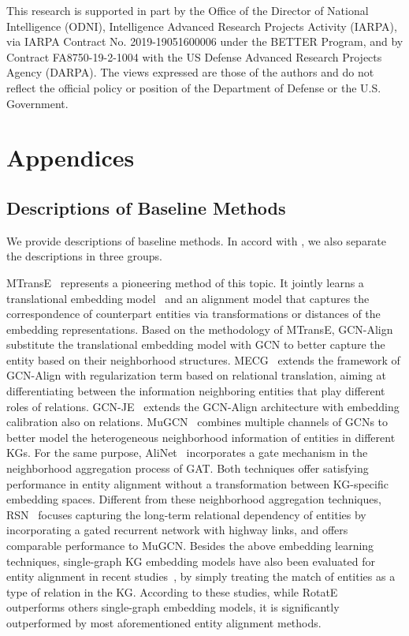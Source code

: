 \documentclass[11pt,a4paper]{article}
\begin{document}
This research is supported in part by the Office of the Director of National Intelligence (ODNI), Intelligence Advanced Research Projects Activity (IARPA), via IARPA Contract No. 2019-19051600006 under the BETTER Program, and by Contract FA8750-19-2-1004 with the US Defense Advanced Research Projects Agency (DARPA). The views expressed are those of the authors and do not reflect the official policy or position of the Department of Defense or the U.S. Government. 




\clearpage
\appendix

\section{Appendices}
\label{sec:appendix}

\subsection{Descriptions of Baseline Methods}\label{sup:base}

We provide descriptions of baseline methods. In accord with , we also separate the descriptions in three groups.


MTransE~\cite{chen2017multigraph} represents a pioneering method of this topic. It jointly learns a translational embedding model~\cite{bordes2013translating} and an alignment model that captures the correspondence of counterpart entities via  transformations or distances of the embedding representations.
Based on the methodology of MTransE, GCN-Align~\cite{wang2018cross} substitute the translational embedding model with GCN to better capture the entity based on their neighborhood structures.
MECG~\cite{li2019semi} extends the framework of GCN-Align with regularization term based on relational translation, aiming at differentiating between the information neighboring entities that play different roles of relations.
GCN-JE~\cite{wu2019jointly} extends the GCN-Align architecture with embedding calibration also on relations.
MuGCN~\cite{cao2019multi} combines multiple channels of GCNs to better model the heterogeneous neighborhood information of entities in different KGs.
For the same purpose, AliNet~\cite{sun2020alinet} incorporates a gate mechanism in the neighborhood aggregation process of GAT.
Both techniques offer satisfying performance in entity alignment without a transformation between KG-specific embedding spaces.
Different from these neighborhood aggregation techniques, RSN~\cite{guo2019learning} focuses capturing the long-term relational dependency of entities by incorporating a gated recurrent network with highway links, and offers comparable performance to MuGCN.
Besides the above embedding learning techniques, single-graph KG embedding models have also been evaluated for entity alignment in recent studies~\cite{guo2019learning,sun2020alinet}, by simply treating the match of entities as a type of relation in the KG.
According to these studies, while RotatE~\cite{sun2019rotate} outperforms others single-graph embedding models, it is significantly outperformed by most aforementioned entity alignment methods.
\end{document}
